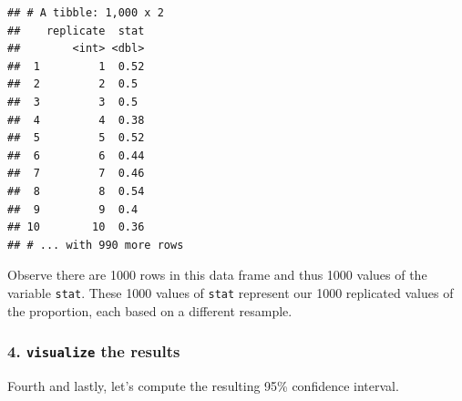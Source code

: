 \documentclass[
]{book}
\newenvironment{Shaded}{\begin{snugshade}}{\end{snugshade}}
\newcommand{\DataTypeTok}[1]{\textcolor[rgb]{0.13,0.29,0.53}{#1}}
\newcommand{\DecValTok}[1]{\textcolor[rgb]{0.00,0.00,0.81}{#1}}
\newcommand{\FloatTok}[1]{\textcolor[rgb]{0.00,0.00,0.81}{#1}}
\newcommand{\KeywordTok}[1]{\textcolor[rgb]{0.13,0.29,0.53}{\textbf{#1}}}
\newcommand{\NormalTok}[1]{#1}
\newcommand{\OperatorTok}[1]{\textcolor[rgb]{0.81,0.36,0.00}{\textbf{#1}}}
\newcommand{\StringTok}[1]{\textcolor[rgb]{0.31,0.60,0.02}{#1}}
\begin{document}
\begin{Shaded}
\end{Shaded}

\begin{verbatim}
## # A tibble: 1,000 x 2
##    replicate  stat
##        <int> <dbl>
##  1         1  0.52
##  2         2  0.5 
##  3         3  0.5 
##  4         4  0.38
##  5         5  0.52
##  6         6  0.44
##  7         7  0.46
##  8         8  0.54
##  9         9  0.4 
## 10        10  0.36
## # ... with 990 more rows
\end{verbatim}

Observe there are 1000 rows in this data frame and thus 1000 values of the variable \texttt{stat}. These 1000 values of \texttt{stat} represent our 1000 replicated values of the proportion, each based on a different resample.

\hypertarget{visualize-the-results-1}{%
\subsubsection*{\texorpdfstring{4. \texttt{visualize} the results}{4. visualize the results}}\label{visualize-the-results-1}}

Fourth and lastly, let's compute the resulting 95\% confidence interval.

\begin{Shaded}
\end{Shaded}
\end{document}
